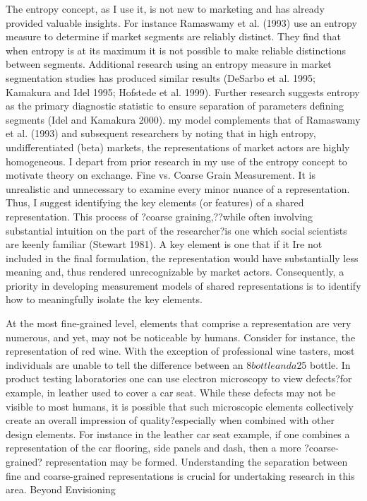 The entropy concept, as I use it, is not new to marketing and has already provided valuable insights. For instance Ramaswamy et al. (1993) use an entropy measure to determine if market segments are reliably distinct. They find that when entropy is at its maximum it is not possible to make reliable distinctions between segments. Additional research using an entropy measure in market segmentation studies has produced similar results (DeSarbo et al. 1995; Kamakura and Idel 1995; Hofstede et al. 1999). Further research suggests entropy as the primary diagnostic statistic to ensure separation of parameters defining segments (Idel and Kamakura 2000). my model complements that of Ramaswamy et al. (1993) and subsequent researchers by noting that in high entropy, undifferentiated (beta) markets, the representations of market actors are highly homogeneous. I depart from prior research in my use of the entropy concept to motivate theory on exchange.
Fine vs. Coarse Grain Measurement. It is unrealistic and unnecessary to examine every minor nuance of a representation. Thus, I suggest identifying the key elements (or features) of a shared representation. This process of ?coarse graining,??while often involving substantial intuition on the part of the researcher?is one which social scientists are keenly familiar (Stewart 1981). A key element is one that if it Ire not included in the final formulation, the representation would have substantially less meaning and, thus rendered unrecognizable by market actors. Consequently, a priority in developing measurement models of shared representations is to identify how to meaningfully isolate the key elements. 

At the most fine-grained level, elements that comprise a representation are very numerous, and yet, may not be noticeable by humans. Consider for instance, the representation of red wine. With the exception of professional wine tasters, most individuals are unable to tell the difference between an $8 bottle and a $25 bottle. In product testing laboratories one can use electron microscopy to view defects?for example, in leather used to cover a car seat. While these defects may not be visible to most humans, it is possible that such microscopic elements collectively create an overall impression of quality?especially when combined with other design elements. For instance in the leather car seat example, if one combines a representation of the car flooring, side panels and dash, then a more ?coarse-grained? representation may be formed. Understanding the separation between fine and coarse-grained representations is crucial for undertaking research in this area.
Beyond Envisioning 

